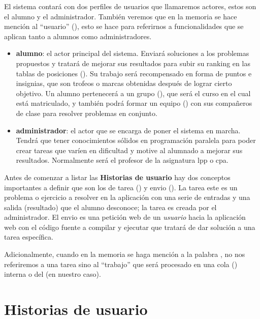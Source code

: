 \documentclass[11pt,spanish,listoffigures,listoftables]{tfgetsinf}
\begin{document}
El sistema contará con dos perfiles de usuarios que llamaremos actores, estos son el \Gls{alumno} y el \Gls{administrador}. También veremos que en la memoria se hace mención al ``usuario'' (), esto se hace para referirnos a funcionalidades que se aplican tanto a \gls{alumno}s como \gls{administrador}es.

\begin{itemize}
    \item \textbf{\gls{alumno}}: el actor principal del sistema. Enviará soluciones a los problemas propuestos y tratará de mejorar sus resultados para subir su ranking en las tablas de posiciones (). Su trabajo será recompensado en forma de puntos e insignias, que son trofeos o marcas obtenidas después de lograr cierto objetivo. Un alumno pertenecerá a un \gls{grupo} (), que será el curso en el cual está matriculado, y también podrá formar un \gls{equipo} () con sus compañeros de clase para resolver problemas en conjunto.
	\item \textbf{\gls{administrador}}: el actor que se encarga de poner el sistema en marcha. Tendrá que tener conocimientos sólidos en programación paralela para poder crear \gls{tarea}s que varíen en dificultad y motive al alumnado a mejorar sus resultados. Normalmente será el profesor de la asignatura \acrshort{lpp} o \acrshort{cpa}.
\end{itemize}

Antes de comenzar a listar las \textbf{Historias de usuario} hay dos conceptos importantes a definir que son los de \gls{tarea} () y \gls{envio} (). La \gls{tarea} este es un problema o ejercicio a resolver en la aplicación con una serie de entradas y una salida (resultado) que el \gls{alumno} desconoce; la \gls{tarea} es creada por el \gls{administrador}. El \gls{envio} es una petición web de un \textit{usuario} hacia la aplicación web con el código fuente a compilar y ejecutar que tratará de dar solución a una \gls{tarea} específica. 

Adicionalmente, cuando en la memoria se haga mención a la palabra , no nos referiremos a una \gls{tarea} sino al ``trabajo'' que será procesado en una cola () interna o del  (\kahan en nuestro caso).

\section{Historias de usuario}
\end{document}
